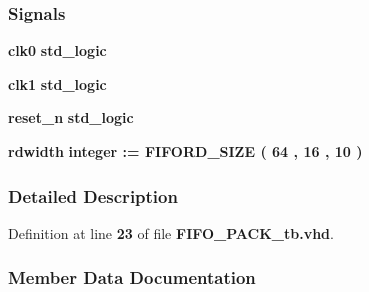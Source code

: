 \subsubsection*{Signals}
 \begin{DoxyCompactItemize}
\item 
{\bf clk0} {\bfseries \textcolor{comment}{std\+\_\+logic}\textcolor{vhdlchar}{ }} 
\item 
{\bf clk1} {\bfseries \textcolor{comment}{std\+\_\+logic}\textcolor{vhdlchar}{ }} 
\item 
{\bf reset\+\_\+n} {\bfseries \textcolor{comment}{std\+\_\+logic}\textcolor{vhdlchar}{ }} 
\item 
{\bf rdwidth} {\bfseries \textcolor{comment}{integer}\textcolor{vhdlchar}{ }\textcolor{vhdlchar}{ }\textcolor{vhdlchar}{\+:}\textcolor{vhdlchar}{=}\textcolor{vhdlchar}{ }\textcolor{vhdlchar}{ }\textcolor{vhdlchar}{ }\textcolor{vhdlchar}{ }\textcolor{vhdlchar}{F\+I\+F\+O\+R\+D\+\_\+\+S\+I\+ZE}\textcolor{vhdlchar}{ }\textcolor{vhdlchar}{(}\textcolor{vhdlchar}{ }\textcolor{vhdlchar}{ } \textcolor{vhdldigit}{64} \textcolor{vhdlchar}{ }\textcolor{vhdlchar}{,}\textcolor{vhdlchar}{ }\textcolor{vhdlchar}{ } \textcolor{vhdldigit}{16} \textcolor{vhdlchar}{ }\textcolor{vhdlchar}{,}\textcolor{vhdlchar}{ }\textcolor{vhdlchar}{ } \textcolor{vhdldigit}{10} \textcolor{vhdlchar}{ }\textcolor{vhdlchar}{)}\textcolor{vhdlchar}{ }} 
\end{DoxyCompactItemize}


\subsubsection{Detailed Description}


Definition at line {\bf 23} of file {\bf F\+I\+F\+O\+\_\+\+P\+A\+C\+K\+\_\+tb.\+vhd}.



\subsubsection{Member Data Documentation}
